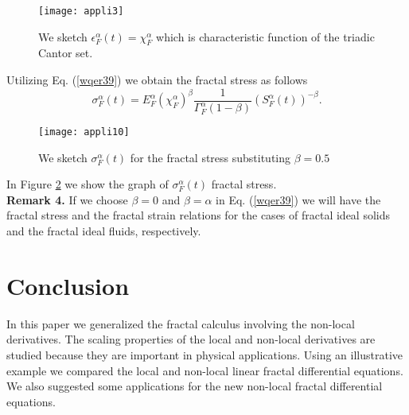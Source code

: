 \documentclass[12pt]{article}
\begin{document}
\begin{figure}[H]
  \centering
  \texttt{[image: appli3]}
  \caption{We sketch  $ \epsilon_{F}^{\alpha}(t)=\chi_{F}^{\alpha}$ which is characteristic function of the triadic Cantor set. }\label{751zswaq67b}
\end{figure}
Utilizing Eq. (\ref{wqer39}) we obtain the  fractal stress as follows
\begin{equation}\label{olp}
  \sigma_{F}^{\alpha}(t)=E_{F}^{\alpha} (\chi_{F}^{\alpha})^{\beta}\frac{1}
{\Gamma^{\alpha}_{F}(1-\beta)}(S_{F}^{\alpha}(t))^{-\beta}.
\end{equation}
\begin{figure}[H]
  \centering
  \texttt{[image: appli10]}
  \caption{We sketch $\sigma_{F}^{\alpha}(t)$ for the fractal stress substituting  $\beta=0.5$ }\label{751zkilujswaq67b}
\end{figure}
In Figure \ref{751zkilujswaq67b} we show the graph of $\sigma_{F}^{\alpha}(t)$ fractal stress.\\
\textbf{Remark 4.}  If we choose $\beta=0$ and $\beta=\alpha$ in Eq. (\ref{wqer39}) we will  have the fractal stress and  the fractal strain relations for the cases of fractal ideal solids and  the fractal ideal fluids, respectively.
\section{ Conclusion \label{7-sec}}
In this paper we generalized the fractal calculus involving the non-local derivatives. The scaling properties of the local and non-local derivatives are studied  because they are important in   physical applications. Using an illustrative example we compared the local and non-local linear fractal differential equations. We also suggested  some applications for the new non-local fractal differential equations.
%
\end{document}
